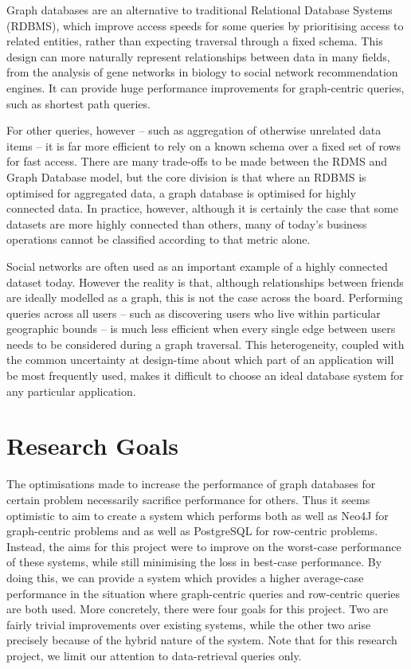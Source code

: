 Graph databases are an alternative to traditional Relational Database Systems
(RDBMS), which improve access speeds for some queries by prioritising access to
related entities, rather than expecting traversal through a fixed schema. This
design can more naturally represent relationships between data in many fields,
from the analysis of gene networks in biology to social network recommendation
engines.  It can provide huge performance improvements for graph-centric
queries, such as shortest path queries. 

For other queries, however -- such as aggregation of otherwise unrelated data
items -- it is far more efficient to rely on a known schema over a fixed set of
rows for fast access. There are many trade-offs to be made between the RDMS and
Graph Database model, but the core division is that where an RDBMS is optimised
for aggregated data, a graph database is optimised for highly connected data.
In practice, however, although it is certainly the case that some datasets are
more highly connected than others, many of today's business operations cannot
be classified according to that metric alone. 


Social networks are often used as an important example of a highly connected
dataset today. However the reality is that, although relationships between
friends are ideally modelled as a graph, this is not the case across the board.
Performing queries across all users -- such as discovering users who live
within particular geographic bounds -- is much less efficient when every single
edge between users needs to be considered during a graph traversal. This
heterogeneity, coupled with the common uncertainty at design-time about which
part of an application will be most frequently used, makes it difficult to
choose an ideal database system for any particular application.


\section{Research Goals}

The optimisations made to increase the performance of graph databases for
certain problem necessarily sacrifice performance for others. Thus it seems
optimistic to aim to create a system which performs both as well as Neo4J for
graph-centric problems and as well as PostgreSQL for row-centric problems.
Instead, the aims for this project were to improve on the worst-case
performance of these systems, while still minimising the loss in best-case
performance. By doing this, we can provide a system which provides a higher
average-case performance in the situation where graph-centric queries and
row-centric queries are both used. More concretely, there were four goals
for this project. Two are fairly trivial improvements over existing systems,
while the other two arise precisely because of the hybrid nature of the system.
Note that for this research project, we limit our attention to data-retrieval queries only.

